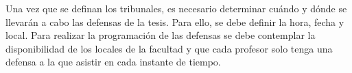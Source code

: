 






 
Una vez que se definan los tribunales, es necesario determinar cuándo 
y dónde se llevarán a cabo las defensas de la tesis. Para ello, se debe definir
la hora, fecha y local.
Para realizar la programación de las defensas se debe contemplar
la disponibilidad de los locales de la facultad y que cada profesor solo tenga 
una defensa a la que asistir en cada instante de tiempo.


